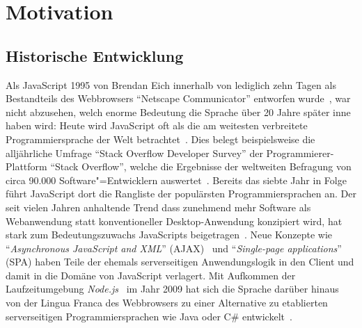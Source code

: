 \chapter{Motivation}
\label{chap:motiviation}

\section{Historische Entwicklung}

Als JavaScript 1995 von Brendan Eich innerhalb von lediglich zehn Tagen als Bestandteils des Webbrowsers \enquote{Netscape Communicator} entworfen wurde~\autocite{severance:2012:js10days}, war nicht abzusehen, welch enorme Bedeutung die Sprache über 20 Jahre später inne haben wird: Heute wird JavaScript oft als die am weitesten verbreitete Programmiersprache der Welt betrachtet~\autocite{CROCKFORD:JS_POPULAR}. Dies belegt beispielsweise die alljährliche Umfrage \enquote{Stack Overflow Developer Survey} der Programmierer-Plattform \enquote{Stack Overflow}, welche die Ergebnisse der weltweiten Befragung von circa 90.000 Software"=Entwicklern auswertet~\autocite{STACKOVERFLOW:SURVEY}. Bereits das siebte Jahr in Folge führt JavaScript dort die Rangliste der populärsten Programmiersprachen an. Der seit vielen Jahren anhaltende Trend dass zunehmend mehr Software als Webanwendung statt konventioneller Desktop-Anwendung konzipiert wird, hat stark zum Bedeutungszuwachs JavaScripts beigetragen~\autocite{TAIVALSAARI:2017,CASTELEYN:2014}. Neue Konzepte wie \enquote{\textit{Asynchronous JavaScript and XML}} (AJAX)~\autocite{GARRET:AJAX} und \enquote{\textit{Single-page applications}} (SPA) haben Teile der ehemals serverseitigen Anwendungslogik in den Client und damit in die Domäne von JavaScript verlagert. Mit Aufkommen der Laufzeitumgebung \textit{Node.js}~\autocite{SOFTWARE:NODEJS} im Jahr 2009 hat sich die Sprache darüber hinaus von der Lingua Franca des Webbrowsers zu einer Alternative zu etablierten serverseitigen Programmiersprachen wie Java oder C\# entwickelt~\autocite{TILKOV:NODEJS}.


